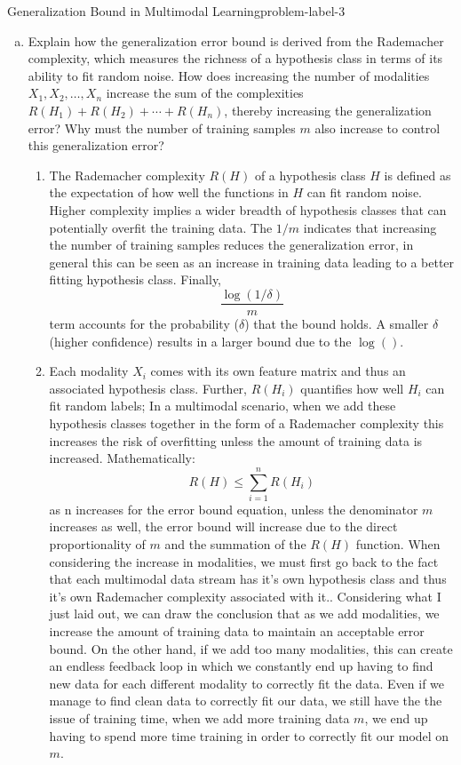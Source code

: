 \begin{problem}{Generalization Bound in Multimodal Learning}{problem-label-3}
	
	 \begin{enumerate}[(a)]
	 	\item Explain how the generalization error bound is derived from the Rademacher complexity, which measures the richness of a hypothesis class in terms of its ability to fit random noise. How does increasing the number of modalities \(X_1, X_2, \dots, X_n\) increase the sum of the complexities \(R(H_1) + R(H_2) + \cdots + R(H_n)\), thereby increasing the generalization error? Why must the number of training samples \(m\) also increase to control this generalization error?
	 	\begin{enumerate}[label = (\roman*)]
	 		\item The Rademacher complexity $R(H)$ of a hypothesis class $H$ is defined as the expectation of how well the functions in $H$ can fit random noise. Higher complexity implies a wider breadth of hypothesis classes that can potentially overfit the training data. The $1/m$ indicates that increasing the number of training samples reduces the generalization error, in general this can be seen as an increase in training data leading to a better fitting hypothesis class. Finally, \[ \frac{\log(1/\delta)}{m} \] term accounts for the probability ($\delta$) that the bound holds. A smaller $\delta$ (higher confidence) results in a larger bound due to the $\log()$.
	 		\item Each modality $X_i$ comes with its own feature matrix and thus an associated hypothesis class. Further, $R(H_i)$ quantifies how well $H_i$ can fit random labels; In a multimodal scenario, when we add these hypothesis classes together in the form of a Rademacher complexity this increases the risk of overfitting unless the amount of training data is increased. Mathematically:  \[ R(H) \leq \sum_{i=1}^{n} R(H_i) \] as n increases for the error bound equation, unless the denominator $m$ increases as well, the error bound will increase due to the direct proportionality of $m$ and the summation of the $R(H)$ function. When considering the increase in modalities, we must first go back to the fact that each multimodal data stream has it's own hypothesis class and thus it's own Rademacher complexity associated with it.. Considering what I just laid out, we can draw the conclusion that as we add modalities, we increase the amount of training data to maintain an acceptable error bound. On the other hand, if we add too many modalities, this can create an endless feedback loop in which we constantly end up having to find new data for each different modality to correctly fit the data. Even if we manage to find clean data to correctly fit our data, we still have the the issue of training time, when we add more training data $m$, we end up having to spend more time training in order to correctly fit our model on $m$. 
	 		
	 		
	 	\end{enumerate}
	 \end{enumerate}
\end{problem}

